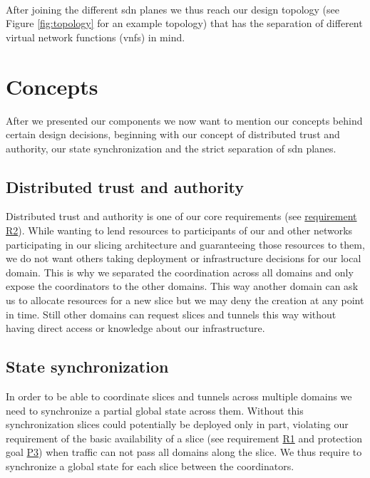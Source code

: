 \paragraph{} After joining the different \acrshort{sdn} planes we thus reach our design topology (see Figure \ref{fig:topology} for an example topology) that has the separation of different virtual network functions (\acrshort{vnf}s) in mind.


\section{Concepts}
\label{design_concepts}
After we presented our components we now want to mention our concepts behind certain design decisions, beginning with our concept of distributed trust and authority, our state synchronization and the strict separation of \acrshort{sdn} planes.

\subsection{Distributed trust and authority}
Distributed trust and authority is one of our core requirements (see \hyperref[R2]{requirement R2}). While wanting to lend resources to participants of our and other networks participating in our slicing architecture and guaranteeing those resources to them, we do not want others taking deployment or infrastructure decisions for our local domain. This is why we separated the coordination across all domains and only expose the coordinators to the other domains. This way another domain can ask us to allocate resources for a new slice but we may deny the creation at any point in time. Still other domains can request slices and tunnels this way without having direct access or knowledge about our infrastructure.

\subsection{State synchronization}
In order to be able to coordinate slices and tunnels across multiple domains we need to synchronize a partial global state across them. Without this synchronization slices could potentially be deployed only in part, violating our requirement of the basic availability of a slice (see requirement \hyperref[R1]{R1} and protection goal \hyperref[P3]{P3}) when traffic can not pass all domains along the slice. We thus require to synchronize a global state for each slice between the coordinators.

